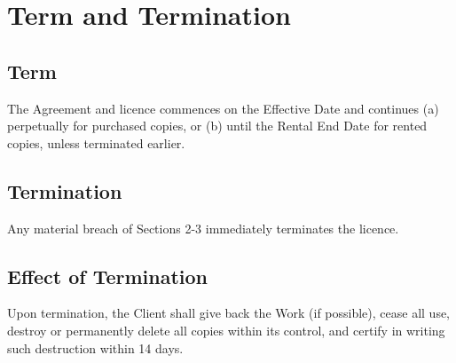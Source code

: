 \section{Term and Termination}


\subsection{Term}
The Agreement and licence commences on the Effective Date and continues 
(a) perpetually for purchased copies, or 
(b) until the Rental End Date for rented copies, unless terminated earlier.


\subsection{Termination}
Any material breach of Sections 2-3 immediately terminates the licence.


\subsection{Effect of Termination}
Upon termination, the Client shall give back the Work (if possible), cease all 
use, destroy or permanently delete all copies within its control, and certify in 
writing such destruction within 14 days.
